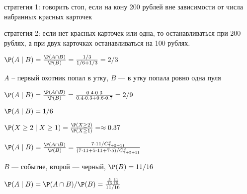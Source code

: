 \begin{solution}{2.8}
стратегия 1: говорить стоп, если на кону 200 рублей вне зависимости от числа набранных красных карточек

 стратегия 2: если нет красных карточек или одна, то останавливаться при 200 рублях, а при двух карточках останавливаться на 100 рублях.
\end{solution}
\begin{solution}{2.9}
\end{solution}
\begin{solution}{2.10}
\end{solution}
\begin{solution}{2.11}
\end{solution}
\begin{solution}{2.12}
\end{solution}
\begin{solution}{2.13}
\end{solution}
\begin{solution}{2.14}
\end{solution}
\begin{solution}{2.15}
\end{solution}
\begin{solution}{2.16}
\end{solution}
\begin{solution}{3.1}
  $\P(A\mid B)=\frac{\P(A \cap B)}{\P(B)}= \frac{1/3}{1/6+1/3}=2/3$
\end{solution}
\begin{solution}{3.2}
  $A$ -- первый охотник попал в утку, $B$ — в утку попала ровно одна пуля

  $\P(A \mid B)=\frac{\P(A \cap B)}{\P(B)}= \frac{0.4 \cdot 0.3 }{0.4\cdot 0.3 + 0.6\cdot 0.7}=2/9$
\end{solution}
\begin{solution}{3.3}
  $\P(A \mid B)=1/6$
\end{solution}
\begin{solution}{3.4}
  $\P(X\geq 2 \mid X\geq 1)=\frac{\P(X \geq 2)}{\P(X \geq 1)}= \approx 0.37$
\end{solution}
\begin{solution}{3.5}
  $\P(A \mid B)=\frac{\P(A \cap B)}{\P(B)}= \frac{7\cdot 11 /C_{7+5+11}^2}{(7\cdot 11+5\cdot 11 + 7\cdot 5) /C_{7+5+11}^2 }$
\end{solution}
\begin{solution}{3.6}
  $B$ — событие, второй — черный, $\P(B)=11/16$

  $\P(A \mid B)=\P(A \cap B)/\P(B)=\frac{\frac{5}{16}\frac{11}{15}}{11/16}$
\end{solution}
